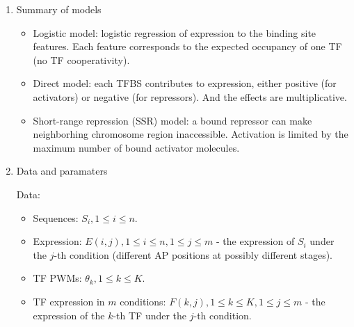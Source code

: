 \documentclass[11pt]{article}
\begin{document}
\begin{enumerate}
\begin{enumerate}
\item{Summary of models}

\begin{itemize}

\item Logistic model: logistic regression of expression to the binding site features. Each feature corresponds to the expected occupancy of one TF (no TF cooperativity). 

\item Direct model: each TFBS contributes to expression, either positive (for activators) or negative (for repressors). And the effects are multiplicative. 

\item Short-range repression (SSR) model: a bound repressor can make neighborhing chromosome region inaccessible. Activation is limited by the maximum number of bound activator molecules. 

\end{itemize}

\item{Data and paramaters}

Data: 
\begin{itemize}
\item Sequences: $S_i, 1 \leq i \leq n$. 
\item Expression: $E(i,j), 1 \leq i \leq n, 1 \leq j \leq m$ - the expression of $S_i$ under the $j$-th condition (different AP positions at possibly different stages). 
\item TF PWMs: $\theta_k, 1 \leq k \leq K$. 
\item TF expression in $m$ conditions: $F(k,j), 1 \leq k \leq K, 1 \leq j \leq m$ - the expression of the $k$-th TF under the $j$-th condition. 
\end{itemize}


\end{enumerate}
\end{enumerate}
\end{document}
